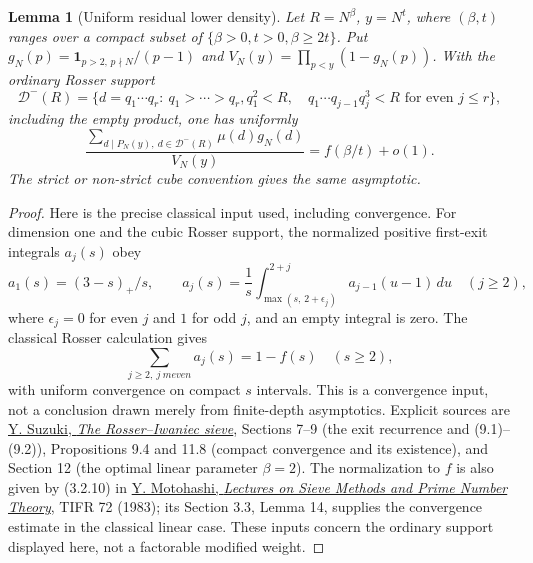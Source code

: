 \documentclass[11pt]{article}
\newtheorem{lemma}[theorem]{Lemma}
\begin{document}
\begin{lemma}[Uniform residual lower density]
\label{lem:uniform-residual-lower-density}
Let $R=N^\beta$, $y=N^t$, where $(\beta,t)$ ranges over a compact
subset of $\{\beta>0,t>0,\beta\ge2t\}$. Put
$g_N(p)=\mathbf1_{p>2,\,p\nmid N}/(p-1)$ and
$V_N(y)=\prod_{p<y}(1-g_N(p))$. With the ordinary Rosser support
\[
 \mathcal D^-(R)=\{d=q_1\cdots q_r:\ q_1>\cdots>q_r,
 q_1^2<R,\quad q_1\cdots q_{j-1}q_j^3<R
 \text{ for even }j\le r\},
\]
including the empty product, one has uniformly
\[
 \frac{\sum_{d\mid P_N(y),\ d\in\mathcal D^-(R)}\mu(d)g_N(d)}
 {V_N(y)}=f(\beta/t)+o(1).
\]
The strict or non-strict cube convention gives the same asymptotic.
\end{lemma}
\begin{proof}
Here is the precise classical input used, including convergence. For
dimension one and the cubic Rosser support, the normalized positive
first-exit integrals $a_j(s)$ obey
\[
 a_1(s)=(3-s)_+/s,\qquad
 a_j(s)=\frac1s\int_{\max(s,\,2+\epsilon_j)}^{2+j}
                  a_{j-1}(u-1)\,du\quad(j\ge2),
\]
where $\epsilon_j=0$ for even $j$ and $1$ for odd $j$, and an
empty integral is zero. The classical Rosser calculation gives
\begin{equation}\label{eq:classical-positive-exit-series}
 \sum_{j\ge2,\ j\ {
m even}}a_j(s)=1-f(s)\quad(s\ge2),
\end{equation}
with uniform convergence on compact $s$ intervals. This is a
convergence input, not a conclusion drawn merely from finite-depth
asymptotics. Explicit sources are
\href{https://www.suzuyu1729.com/notes/NagoyaSeminar2022/RosserIwaniec.pdf}
{Y. Suzuki, \emph{The Rosser--Iwaniec sieve}}, Sections 7--9
(the exit recurrence and (9.1)--(9.2)), Propositions 9.4 and 11.8
(compact convergence and its existence), and Section 12
(the optimal linear parameter $\beta=2$).
The normalization to $f$ is also given by (3.2.10) in
\href{https://mathweb.tifr.res.in/Documents/Publications/Lectures/tifr72.pdf}
{Y. Motohashi, \emph{Lectures on Sieve Methods and Prime Number Theory}},
TIFR 72 (1983); its Section 3.3, Lemma 14, supplies the convergence
estimate in the classical linear case. These inputs concern the
ordinary support displayed here, not a factorable modified weight.


\end{proof}
\end{document}
